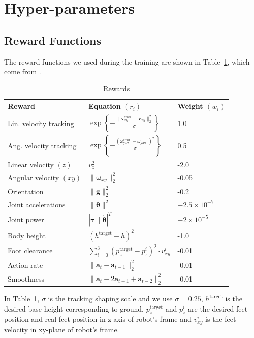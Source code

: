 \section{Hyper-parameters}
\subsection{Reward Functions}
\label{app:rewards}
The reward functions we used during the training are shown in Table~\ref{reward}, which come from \cite{kumar2021rma, agarwal2023legged, margolis2023walk, fu2021minimizing}.

\begin{table}[h]
    \centering
    \caption{Rewards}
    \begin{tabular}{lll}
    \toprule[1.5pt] Reward & Equation $\left(r_i\right)$ & Weight $\left(w_i\right)$ \\
    \midrule[1.5pt] Lin. velocity tracking & $\exp \left\{- \frac{\|\mathbf{v}_{x y}^{\text {cmd }}-\mathbf{v}_{x y}\|_2^2}{\sigma}  \right\}$ & 1.0 \\
    Ang. velocity tracking & $\exp \left\{- \frac{\left(\omega_{\text {yaw }}^{\text {cmd }}-\omega_{\text {yaw }}\right)^2}{\sigma} \right\}$ & 0.5 \\
    Linear velocity $(z)$ & $v_z^2$ & -2.0 \\
    Angular velocity $(x y)$ & $\|\boldsymbol{\omega}_{x y}\|_2^2$ & -0.05 \\
    Orientation & $\|\mathbf{g}\|_2^2$ & -0.2 \\
    Joint accelerations & $\|\ddot{\boldsymbol{\theta}}\|^2$ & $-2.5 \times 10^{-7}$ \\
    Joint power & $|\boldsymbol{\tau} \| \dot{\boldsymbol{\theta}}|^{T}$ & $-2 \times 10^{-5}$ \\
    Body height & $\left(h^{\text {target}}-h\right)^2$ & -1.0 \\
    Foot clearance & $\sum_{i=0}^{3}\left(p_{z}^{\text {target}}-p_{z}^{i}\right)^2 \cdot v_{xy}^{i}$ & -0.01 \\
    Action rate & $\|\mathbf{a}_t-\mathbf{a}_{t-1}\|_2^2$ & -0.01 \\
    Smoothness & $\|\mathbf{a}_t-2 \mathbf{a}_{t-1}+\mathbf{a}_{t-2}\|_2^2$ & -0.01 \\
    \bottomrule[1.5pt]
    \end{tabular}
    \label{reward}
\end{table}

In Table~\ref{reward}, $\sigma$ is the tracking shaping scale and we use $\sigma = 0.25$, $h^{\text{target}}$ is the desired base height corresponding to ground, $p_z^{\text{target}}$ and $p_z^i$ are the desired feet position and real feet position in z-axis of robot's frame and $v_{xy}^i$ is the feet velocity in xy-plane of robot's frame.

